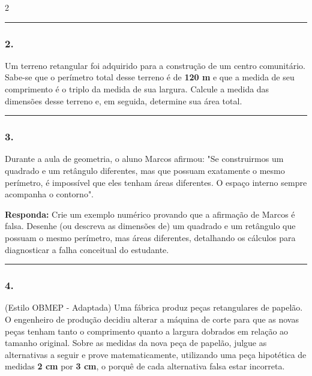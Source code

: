 \documentclass[twoside, 10pt, a4paper]{article}
\newlength{\espacoPreQuestao}\setlength{\espacoPreQuestao}{0.1cm}
\newlength{\espacoQuestao}\setlength{\espacoQuestao}{0.2cm}
\begin{document}
\begin{multicols*}{2}
\noindent\textcolor{CorLinha}{\rule{\linewidth}{0.5pt}} 
\par\vspace{\espacoPreQuestao}
\subsubsection*{2.} Um terreno retangular foi adquirido para a construção de um centro comunitário. Sabe-se que o perímetro total desse terreno é de \textbf{120 m} e que a medida de seu comprimento é o triplo da medida de sua largura. Calcule a medida das dimensões desse terreno e, em seguida, determine sua área total.
\par\vspace{\espacoQuestao}

\noindent\textcolor{CorLinha}{\rule{\linewidth}{0.5pt}}
\par\vspace{\espacoPreQuestao}
\subsubsection*{3.} Durante a aula de geometria, o aluno Marcos afirmou: "Se construirmos um quadrado e um retângulo diferentes, mas que possuam exatamente o mesmo perímetro, é impossível que eles tenham áreas diferentes. O espaço interno sempre acompanha o contorno". 
\begin{boxresponda}
\textbf{Responda:} Crie um exemplo numérico provando que a afirmação de Marcos é falsa. Desenhe (ou descreva as dimensões de) um quadrado e um retângulo que possuam o mesmo perímetro, mas áreas diferentes, detalhando os cálculos para diagnosticar a falha conceitual do estudante.
\end{boxresponda}
\par\vspace{\espacoQuestao}

\noindent\textcolor{CorLinha}{\rule{\linewidth}{0.5pt}} 
\par\vspace{\espacoPreQuestao}
\subsubsection*{4.} (Estilo OBMEP - Adaptada) Uma fábrica produz peças retangulares de papelão. O engenheiro de produção decidiu alterar a máquina de corte para que as novas peças tenham tanto o comprimento quanto a largura dobrados em relação ao tamanho original. Sobre as medidas da nova peça de papelão, julgue as alternativas a seguir e prove matematicamente, utilizando uma peça hipotética de medidas \textbf{2 cm} por \textbf{3 cm}, o porquê de cada alternativa falsa estar incorreta.


\end{multicols*}
\end{document}
